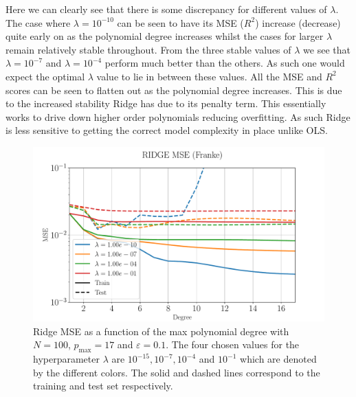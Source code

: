 \documentclass[%
reprint,
amsmath,amssymb,
aps,
pra,
]{revtex4-2}
\begin{document}
Here we can clearly see that there is some discrepancy for different values of $\lambda$. The case where $\lambda=10^{-10}$ can be seen to have its MSE ($R^2$) increase (decrease) quite early on as the polynomial degree increases whilst the cases for larger $\lambda$ remain relatively stable throughout. From the three stable values of $\lambda$ we see that $\lambda=10^{-7}$ and $\lambda=10^{-4}$ perform much better than the others. As such one would expect the optimal $\lambda$ value to lie in between these values. All the MSE and $R^2$ scores can be seen to flatten out as the polynomial degree increases. This is due to the increased stability Ridge has due to its penalty term. This essentially works to drive down higher order polynomials reducing overfitting. As such Ridge is less sensitive to getting the correct model complexity in place unlike OLS.
\begin{figure}[ht!]
	\centering
	\includegraphics[width=\linewidth]{Python/Figures/Ridge/RIDGE_MSE_no_scaling.pdf}
	\caption{Ridge MSE as a function of the max polynomial degree with \(N=100\), \(p_{\text{max}}=17\) and \(\varepsilon=0.1\). The four chosen values for the hyperparameter $\lambda$ are $10^{-15},10^{-7},10^{-4}$ and $10^{-1}$ which are denoted by the different colors. The solid and dashed lines correspond to the training and test set respectively.}
	\label{fig:ridge_mse_degree}
\end{figure}
\end{document}
